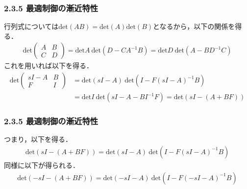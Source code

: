 \begin{frame}[t]
\frametitle{2.3.5 最適制御の漸近特性}
行列式については$\mbox{det}(AB) = \mbox{det}(A)\mbox{det}(B)$となるから，以下の関係を得る．
\begin{align}
	\mbox{det}
	\left(\begin{array}{cc}
		A & B \\
		C & D
	\end{array}\right)
	=
	\mbox{det}A \ \mbox{det}(D-CA^{-1}B)
	=
	\mbox{det}D \ \mbox{det}({A-BD^{-1}C})	
\nonumber
\end{align}
これを用いれば以下を得る．
\begin{align}
	\mbox{det}
	\left(\begin{array}{cc}
		sI-A & B \\
		F    & I
	\end{array}\right)
	&=
	\mbox{det}(sI-A) \ \mbox{det}(I- F(sI-A)^{-1}B)
\nonumber \\
	&=
	\mbox{det}I \ \mbox{det}({sI-A - B I^{-1}F})	
	=
	\mbox{det}({sI-(A + B F)})	
\nonumber
\end{align}
\end{frame}

\begin{frame}[t]
\frametitle{2.3.5 最適制御の漸近特性}
つまり，以下を得る．
\begin{align}
	\mbox{det}({sI-(A + B F)})	
	=
	\mbox{det}(sI-A) \ \mbox{det}(I- F(sI-A)^{-1}B)
\end{align}
同様に以下が得られる．
\begin{align}
	\mbox{det}({-sI-(A + B F)})	
	=
	\mbox{det}(-sI-A) \ \mbox{det}(I- F(-sI-A)^{-1}B)
\end{align}
\end{frame}

